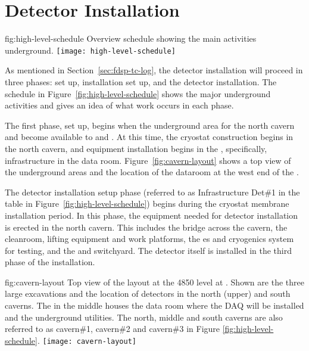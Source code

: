 \section{Detector Installation}
\label{sec:fdsp-tc-inst}



\begin{dunefigure}{fig:high-level-schedule}
  {Overview schedule showing the main activities underground.}
\texttt{[image: high-level-schedule]}
\end{dunefigure}


As mentioned in Section~\ref{sec:fdsp-tc-log}, the  detector installation will proceed in three phases:  set up, installation set up, and the detector installation. The schedule in Figure~\ref{fig:high-level-schedule} shows the major underground activities and gives an idea of what work occurs in each phase. 

The first phase,  set up, begins when the underground area for the north cavern and  become available to  and . At this time, the  cryostat construction begins in the north cavern, and  equipment installation 
begins in the , specifically, infrastructure in the  data room. Figure~\ref{fig:cavern-layout} shows a top view of the underground areas and the location of the dataroom at the west end of the . 

The detector installation setup phase (referred to as Infrastructure Det\#1 in the table in Figure~\ref{fig:high-level-schedule}) begins during the cryostat membrane installation period. 
In this phase, the equipment needed for detector installation is erected in the north cavern. This includes the bridge across the cavern, the cleanroom, lifting equipment and work platforms, the \coldbox{}es and cryogenics system for  testing, and the  and switchyard. 
The detector itself is installed in the third phase of the installation. 

\begin{dunefigure}{fig:cavern-layout}
  {Top view of the layout at the 4850 level at . Shown are the three large excavations and the location of detectors in the north (upper) and south caverns. 
  The  in the middle houses the  data room where the DAQ will be installed and the underground utilities. The north, middle and south caverns are also referred to as cavern\#1, cavern\#2 and cavern\#3 in Figure \ref{fig:high-level-schedule}.}
\texttt{[image: cavern-layout]}
\end{dunefigure}


